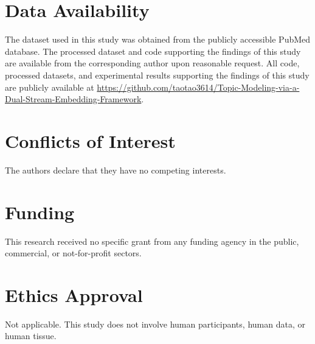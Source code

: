 \documentclass[authorproof,JACIII,researchpaper]{fujipressarticle}
\begin{document}



\section*{Data Availability}
The dataset used in this study was obtained from the publicly accessible PubMed database. The processed dataset and code supporting the findings of this study are available from the corresponding author upon reasonable request. All code, processed datasets, and experimental results supporting the findings of this study are publicly available at \url{https://github.com/taotao3614/Topic-Modeling-via-a-Dual-Stream-Embedding-Framework}.

\section*{Conflicts of Interest}
The authors declare that they have no competing interests.

\section*{Funding}
This research received no specific grant from any funding agency in the public, commercial, or not-for-profit sectors.

\section*{Ethics Approval}
Not applicable. This study does not involve human participants, human data, or human tissue.

\begin{profile}
	\Membership{$\bullet$ }
\end{profile}
\end{document}
